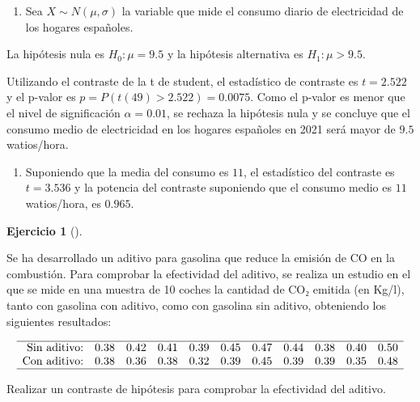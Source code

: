 \documentclass[
  spanish,
  a4paper,
]{scrreport}
\providecommand{\tightlist}{%
  \setlength{\itemsep}{0pt}\setlength{\parskip}{0pt}}
\theoremstyle{definition}
\newtheorem{exercise}{Ejercicio}[chapter]
\theoremstyle{remark}
\begin{document}
\begin{tcolorbox}[enhanced jigsaw, arc=.35mm, bottomrule=.15mm, bottomtitle=1mm, breakable, colback=white, colbacktitle=quarto-callout-tip-color!10!white, colframe=quarto-callout-tip-color-frame, coltitle=black, left=2mm, leftrule=.75mm, opacityback=0, opacitybacktitle=0.6, rightrule=.15mm, title=\textcolor{quarto-callout-tip-color}{\faLightbulb}\hspace{0.5em}{Solución}, titlerule=0mm, toprule=.15mm, toptitle=1mm]

\begin{enumerate}
\def\labelenumi{\alph{enumi}.}
\tightlist
\item
  Sea \(X\sim N(\mu,\sigma)\) la variable que mide el consumo diario de
  electricidad de los hogares españoles.
\end{enumerate}

La hipótesis nula es \(H_0: \mu=9.5\) y la hipótesis alternativa es
\(H_1: \mu> 9.5\).

Utilizando el contraste de la t de student, el estadístico de contraste
es \(t=2.522\) y el p-valor es \(p = P(t(49)>2.522) = 0.0075\). Como el
p-valor es menor que el nivel de significación \(\alpha = 0.01\), se
rechaza la hipótesis nula y se concluye que el consumo medio de
electricidad en los hogares españoles en 2021 será mayor de \(9.5\)
watios/hora.

\begin{enumerate}
\def\labelenumi{\alph{enumi}.}
\tightlist
\item
  Suponiendo que la media del consumo es \(11\), el estadístico del
  contraste es \(t = 3.536\) y la potencia del contraste suponiendo que
  el consumo medio es \(11\) watios/hora, es \(0.965\).
\end{enumerate}

\end{tcolorbox}

\begin{exercise}[]\protect\hypertarget{exr-contraste-media-emision-CO2}{}\label{exr-contraste-media-emision-CO2}

Se ha desarrollado un aditivo para gasolina que reduce la emisión de CO
en la combustión. Para comprobar la efectividad del aditivo, se realiza
un estudio en el que se mide en una muestra de 10 coches la cantidad de
CO₂ emitida (en Kg/l), tanto con gasolina con aditivo, como con gasolina
sin aditivo, obteniendo los siguientes resultados:

\[
\begin{array}{rcccccccccc}
\hline
\mbox{Sin aditivo:}  & 0.38 & 0.42 & 0.41 & 0.39 & 0.45 & 0.47 & 0.44 & 0.38 & 0.40 & 0.50  \\
\mbox{Con  aditivo:} & 0.38 & 0.36 & 0.38 & 0.32 & 0.39 & 0.45 & 0.39 & 0.39 & 0.35 & 0.48 \\
\hline
\end{array}
\]

Realizar un contraste de hipótesis para comprobar la efectividad del
aditivo.

\end{exercise}
\end{document}
